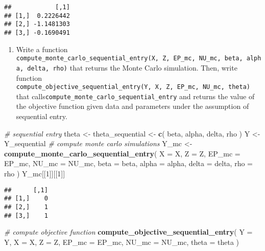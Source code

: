 \documentclass[
]{book}
\newenvironment{Shaded}{\begin{snugshade}}{\end{snugshade}}
\newcommand{\AttributeTok}[1]{\textcolor[rgb]{0.13,0.29,0.53}{#1}}
\newcommand{\CommentTok}[1]{\textcolor[rgb]{0.56,0.35,0.01}{\textit{#1}}}
\newcommand{\DecValTok}[1]{\textcolor[rgb]{0.00,0.00,0.81}{#1}}
\newcommand{\FunctionTok}[1]{\textcolor[rgb]{0.13,0.29,0.53}{\textbf{#1}}}
\newcommand{\NormalTok}[1]{#1}
\newcommand{\OtherTok}[1]{\textcolor[rgb]{0.56,0.35,0.01}{#1}}
\providecommand{\tightlist}{%
  \setlength{\itemsep}{0pt}\setlength{\parskip}{0pt}}
\begin{document}
\begin{verbatim}
##            [,1]
## [1,]  0.2226442
## [2,] -1.1481303
## [3,] -0.1690491
\end{verbatim}

\begin{enumerate}
\def\labelenumi{\arabic{enumi}.}
\setcounter{enumi}{1}
\tightlist
\item
  Write a function \texttt{compute\_monte\_carlo\_sequential\_entry(X,\ Z,\ EP\_mc,\ NU\_mc,\ beta,\ alpha,\ delta,\ rho)} that returns the Monte Carlo simulation. Then, write function \texttt{compute\_objective\_sequential\_entry(Y,\ X,\ Z,\ EP\_mc,\ NU\_mc,\ theta)} that calls\texttt{compute\_monte\_carlo\_sequential\_entry} and returns the value of the objective function given data and parameters under the assumption of sequential entry.
\end{enumerate}

\begin{Shaded}
\begin{Highlighting}[]
\CommentTok{\# sequential entry}
\NormalTok{theta }\OtherTok{\textless{}{-}} 
\NormalTok{  theta\_sequential }\OtherTok{\textless{}{-}}
  \FunctionTok{c}\NormalTok{(}
\NormalTok{    beta, }
\NormalTok{    alpha, }
\NormalTok{    delta, }
\NormalTok{    rho}
\NormalTok{    )}
\NormalTok{Y }\OtherTok{\textless{}{-}}\NormalTok{ Y\_sequential}
\CommentTok{\# compute monte carlo simulations }
\NormalTok{Y\_mc }\OtherTok{\textless{}{-}} 
  \FunctionTok{compute\_monte\_carlo\_sequential\_entry}\NormalTok{(}
    \AttributeTok{X =}\NormalTok{ X, }
    \AttributeTok{Z =}\NormalTok{ Z, }
    \AttributeTok{EP\_mc =}\NormalTok{ EP\_mc, }
    \AttributeTok{NU\_mc =}\NormalTok{ NU\_mc, }
    \AttributeTok{beta =}\NormalTok{ beta, }
    \AttributeTok{alpha =}\NormalTok{ alpha, }
    \AttributeTok{delta =}\NormalTok{ delta, }
    \AttributeTok{rho =}\NormalTok{ rho}
\NormalTok{    )}
\NormalTok{Y\_mc[[}\DecValTok{1}\NormalTok{]][[}\DecValTok{1}\NormalTok{]]}
\end{Highlighting}
\end{Shaded}

\begin{verbatim}
##      [,1]
## [1,]    0
## [2,]    1
## [3,]    1
\end{verbatim}

\begin{Shaded}
\begin{Highlighting}[]
\CommentTok{\# compute objective function}
\FunctionTok{compute\_objective\_sequential\_entry}\NormalTok{(}
  \AttributeTok{Y =}\NormalTok{ Y, }
  \AttributeTok{X =}\NormalTok{ X, }
  \AttributeTok{Z =}\NormalTok{ Z, }
  \AttributeTok{EP\_mc =}\NormalTok{ EP\_mc, }
  \AttributeTok{NU\_mc =}\NormalTok{ NU\_mc, }
  \AttributeTok{theta =}\NormalTok{ theta}
\NormalTok{  )}
\end{Highlighting}
\end{Shaded}
\end{document}
